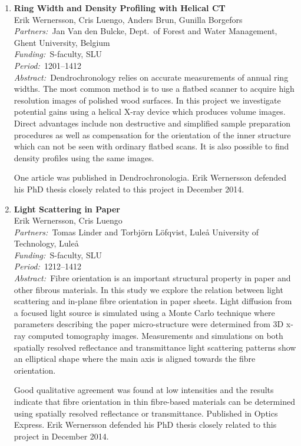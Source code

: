 \documentclass[10pt, a4paper]{article}
\newcommand{\aabstract}[1]{\emph{Abstract:~}#1}
\newcommand{\ffunding}[1]{\emph{Funding:~}#1\\}
\newcommand{\ppartners}[1]{\emph{Partners:~}#1\\}
\newcommand{\pperiod}[1]{\emph{Period:~}#1\\}
\begin{document}
{\begin{enumerate}
	\item
	\textbf{Ring Width and Density Profiling with Helical CT}\\
	Erik Wernersson, Cris Luengo, Anders Brun, Gunilla Borgefors \\
	\ppartners{Jan Van den Bulcke, Dept.~of Forest and Water Management, Ghent University, Belgium}
	\ffunding{S-faculty, SLU}
	\pperiod{1201--1412}
	\aabstract{Dendrochronology relies on accurate measurements of annual ring widths. The most
		common method is to use a flatbed scanner to acquire high resolution images of polished wood
		surfaces. In this project we investigate potential gains using a helical X-ray device which produces
		volume images. Direct advantages include non destructive and simplified sample preparation procedures
		as well as compensation for the orientation of the inner structure which can not be seen
		with ordinary flatbed scans. It is also possible to find density profiles using the same images.
		
		One article was published in Dendrochronologia. Erik Wernersson defended his PhD thesis closely related to this project in December 2014.}
	

\newpage
	\item
	\textbf{Light Scattering in Paper}\\
	Erik Wernersson, Cris Luengo \\
	\ppartners{Tomas Linder and Torbj\"{o}rn L\"{o}fqvist, Lule\r{a} University of Technology, Lule\r{a}}
	\ffunding{S-faculty, SLU}
	\pperiod{1212--1412}
	\aabstract{Fibre orientation is an important structural property in paper and other fibrous materials.
		In this study we explore the relation between light scattering and in-plane fibre orientation
		in paper sheets. Light diffusion from a focused light source is simulated using a
		Monte Carlo technique where parameters describing the paper micro-structure were determined
		from 3D x-ray computed tomography images. Measurements and simulations on both spatially
		resolved reflectance and transmittance light scattering patterns show an elliptical shape
		where the main axis is aligned towards the fibre orientation.
		
		Good qualitative agreement was found at low intensities and the results indicate that
		fibre orientation in thin fibre-based materials can be determined using spatially resolved
		reflectance or transmittance. Published in Optics Express. Erik Wernersson defended his PhD thesis closely related to this project in December 2014.}


\end{enumerate}}
\end{document}
